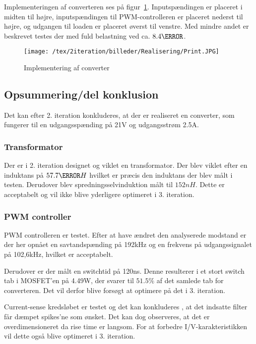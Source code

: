 Implementeringen af converteren ses på figur~\ref{fig:Mini_Mount}. Inputspændingen er placeret i midten til højre, inputspændingen til PWM-controlleren er placeret nederst til højre, og udgangen til loaden er placeret øverst til venstre. Med mindre andet er beskrevet testes der med fuld belastning ved ca. $8.4\ohm$.

\begin{figure}[H]
	\center
	\texttt{[image: /tex/2iteration/billeder/Realisering/Print.JPG]}
	\caption{Implementering af converter}
	\label{fig:Mini_Mount}
\end{figure}



\subsection{Opsummering/del konklusion}
Det kan efter 2. iteration konkluderes, at der er realiseret en converter, som fungerer til en udgangsspænding på 21V og udgangsstrøm 2.5A.
\subsubsection{Transformator}
Der er i 2. iteration designet og viklet en transformator. Der blev viklet efter en induktans på $57.7\micro H$ hvilket er præcis den induktans der blev målt i testen. Derudover blev spredningsselvinduktion målt til $152nH$. Dette er acceptabelt og vil ikke blive yderligere optimeret i 3. iteration. 
\subsubsection{PWM controller} 
PWM controlleren er testet. Efter at have ændret den analyserede modstand er der her opnået en savtandspænding på 192kHz og en frekvens på udgangssignalet på 102,6kHz, hvilket er acceptabelt.


\noindent Derudover er der målt en switchtid på 120ns. Denne resulterer i et stort switch tab i MOSFET'en på 4.49W, der svarer til $51.5\percent$ af det samlede tab for converteren.  Det vil derfor blive forsøgt at optimere på det i 3. iteration. 


\noindent Current-sense kredsløbet er testet og det kan konkluderes , at det indsatte filter får dæmpet spikes'ne som ønsket. Det kan dog observeres, at det er overdimensioneret da rise time er langsom. For at forbedre I/V-karakteristikken vil dette også blive optimeret i 3. iteration. 
